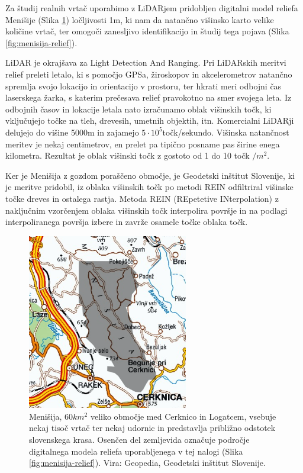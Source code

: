 \documentclass[a4paper, twoside, 12pt]{book}
\begin{document}
  Za študij realnih vrtač uporabimo z LiDARjem pridobljen digitalni model reliefa Menišije (Slika \ref{fig:menisija-karta}) ločljivosti 1m, ki nam da natančno višinsko karto velike količine vrtač, ter omogoči zanesljivo identifikacijo in študij tega pojava (Slika \ref{fig:menisija-relief}).

  LiDAR je okrajšava za Light Detection And Ranging. Pri LiDARskih meritvi relief preleti letalo, ki s pomočjo GPSa, žiroskopov in akcelerometrov natančno spremlja svojo lokacijo in orientacijo v prostoru, ter hkrati meri odbojni čas laserskega žarka, s katerim prečesava relief pravokotno na smer svojega leta. Iz odbojnih časov in lokacije letala nato izračunamo oblak višinskih točk, ki vključujejo točke na tleh, drevesih, umetnih objektih, itn. Komercialni LiDARji delujejo do višine 5000m in zajamejo $5 \cdot 10^5$točk/sekundo. Višinska natančnost meritev je nekaj centimetrov, en prelet pa tipično posname pas širine enega kilometra. Rezultat je oblak višinski točk z gostoto od 1 do 10 točk $/ m^2$.

  Ker je Menišija z gozdom poraščeno območje, je Geodetski inštitut Slovenije, ki je meritve pridobil, iz oblaka višinskih točk po metodi REIN \cite{Kobler20079} odfiltriral višinske točke dreves in ostalega rastja. Metoda REIN (REpetetive INterpolation) z naključnim vzorčenjem oblaka višinskih točk interpolira površje in na podlagi interpoliranega površja izbere in zavrže osamele točke oblaka točk.

  \begin{figure}[h]
    \begin{center}
      \includegraphics[width=7cm]{slike/menisija-karta}
    \end{center}
    \caption{Menišija, $60 km^2$ veliko območje med Cerknico in Logatcem, vsebuje nekaj tisoč vrtač ter nekaj udornic in predstavlja približno odstotek slovenskega krasa. Osenčen del zemljevida označuje področje digitalnega modela reliefa uporabljenega v tej nalogi (Slika \ref{fig:menisija-relief}). Vira: Geopedia, Geodetski inštitut Slovenije.}
    \label{fig:menisija-karta}
  \end{figure}
\end{document}
